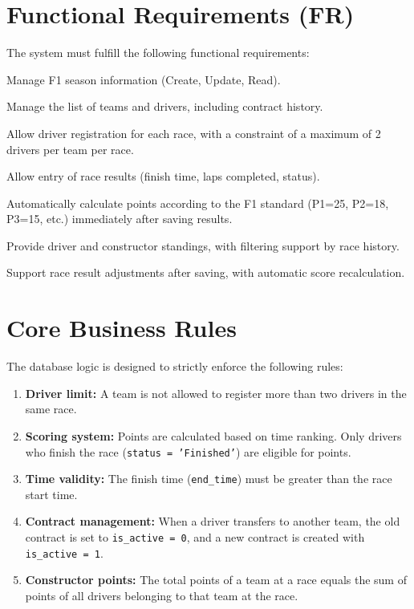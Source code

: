 \documentclass[12pt, a4paper]{report}
\begin{document}
\section{Functional Requirements (FR)}
The system must fulfill the following functional requirements:
\begin{description}[leftmargin=1.5cm, style=nextline]
    \item[FR-01] Manage F1 season information (Create, Update, Read).
    \item[FR-02] Manage the list of teams and drivers, including contract history.
    \item[FR-03] Allow driver registration for each race, with a constraint of a maximum of 2 drivers per team per race.
    \item[FR-04] Allow entry of race results (finish time, laps completed, status).
    \item[FR-05] Automatically calculate points according to the F1 standard (P1=25, P2=18, P3=15, etc.) immediately after saving results.
    \item[FR-06] Provide driver and constructor standings, with filtering support by race history.
    \item[FR-07] Support race result adjustments after saving, with automatic score recalculation.
\end{description}

\section{Core Business Rules}
The database logic is designed to strictly enforce the following rules:
\begin{enumerate}
    \item \textbf{Driver limit:} A team is not allowed to register more than two drivers in the same race.
    \item \textbf{Scoring system:} Points are calculated based on time ranking. Only drivers who finish the race (\texttt{status = 'Finished'}) are eligible for points.
    \item \textbf{Time validity:} The finish time (\texttt{end\_time}) must be greater than the race start time.
    \item \textbf{Contract management:} When a driver transfers to another team, the old contract is set to \texttt{is\_active = 0}, and a new contract is created with \texttt{is\_active = 1}.
    \item \textbf{Constructor points:} The total points of a team at a race equals the sum of points of all drivers belonging to that team at the race.
\end{enumerate}
\end{document}
